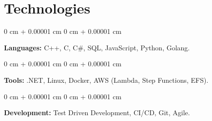 \documentclass[10pt, letterpaper]{article}
\newenvironment{onecolentry}{
    \begin{adjustwidth}{
        0 cm + 0.00001 cm
    }{
        0 cm + 0.00001 cm
    }
}{
    \end{adjustwidth}
} %
\begin{document}
    \section{Technologies}
        
        \begin{onecolentry}
            \textbf{Languages:} C++, C, C\#, SQL, JavaScript, Python, Golang.
        \end{onecolentry}

        \vspace{0.2 cm}

        \begin{onecolentry}
            \textbf{Tools:} .NET, Linux, Docker, AWS (Lambda, Step Functions, EFS).
        \end{onecolentry}

        \vspace{0.2 cm}

        \begin{onecolentry}
            \textbf{Development:} Test Driven Development, CI/CD, Git, Agile.
        \end{onecolentry}
    
\end{document}
